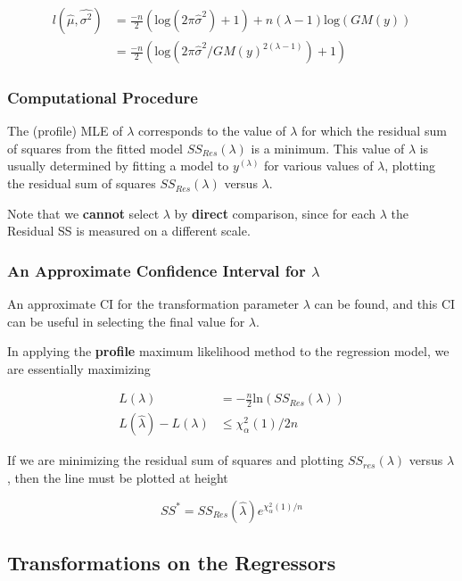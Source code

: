 \documentclass[12pt]{article}
\begin{document}
$$
\begin{aligned}
l(\hat{\mu},\hat{\sigma^2}) &= \frac{-n}{2} \left(\mathrm{log}(2\pi\hat{\sigma}^2) + 1 \right) + n(\lambda-1)\mathrm{log}(GM(y)) \\[8pt]
&= \frac{-n}{2} \left(\mathrm{log}(2\pi\hat{\sigma}^2/GM(y)^{2(\lambda-1)}) + 1 \right)
\end{aligned}
$$


\subsubsection*{Computational Procedure}

The (profile) MLE of $\lambda$ corresponds to the value of $\lambda$ for which the residual sum of squares from the fitted model $SS_{Res}(\lambda)$ is a minimum. This value of $\lambda$ is usually determined by fitting a model to $y^{(\lambda)}$ for various values of $\lambda$, plotting the residual sum of squares $SS_{Res}(\lambda)$ versus $\lambda$.

Note that we \textbf{cannot} select $\lambda$ by \textbf{direct} comparison, since for each $\lambda$ the Residual SS is measured on a different scale. 



\subsubsection*{An Approximate Confidence Interval for $\lambda$}

An approximate CI for the transformation parameter $\lambda$ can be found, and this CI can be useful in selecting the final value for $\lambda$. 

In applying the \textbf{profile} maximum likelihood method to the regression model, we are essentially maximizing

$$
\begin{aligned}
L(\lambda) &= -\frac{n}{2} \mathrm{ln} (SS_{Res}(\lambda)) \\[8pt]
L(\hat{\lambda}) - L(\lambda) &\le \chi^2_\alpha(1)/{2n}
\end{aligned}
$$

If we are minimizing the residual sum of squares and plotting $SS_{res}(\lambda)$ versus $\lambda$, then the line must be plotted at height

$$
SS^\ast = SS_{Res}(\hat{\lambda}) e^{\chi^2_\alpha(1)/n}
$$


\subsection{Transformations on the Regressors}
\end{document}
